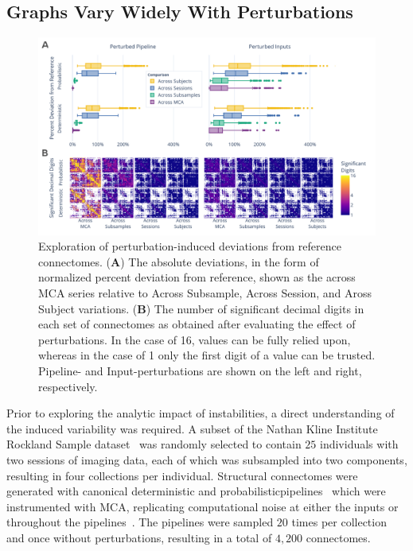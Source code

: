 \documentclass[fleqn,10pt]{SelfArx} %
\begin{document}
\subsection*{Graphs Vary Widely With Perturbations}
\begin{figure}[hbt]\centering
\includegraphics[width=0.98\linewidth]{figures/fig1_absolute_differences.pdf}
\caption{Exploration of perturbation-induced deviations from reference connectomes.
(\textbf{A}) The absolute deviations, in the form of normalized percent deviation from reference, shown as the
across MCA series relative to Across Subsample, Across Session, and Aross Subject variations.
(\textbf{B}) The number of significant decimal digits in each set of connectomes as obtained after evaluating the
effect of perturbations. In the case of 16, values can be fully relied upon, whereas in the case of 1 only the first
digit of a value can be trusted. Pipeline- and Input-perturbations are shown on the left and right, respectively.}
\label{fig:absolute}
\end{figure}

Prior to exploring the analytic impact of instabilities, a direct understanding of the induced variability was
required. A subset of the Nathan Kline Institute Rockland Sample dataset~\cite{Nooner2012-eg} was randomly selected to
contain $25$ individuals with two sessions of imaging data, each of which was subsampled into two components, resulting
in four collections per individual. Structural connectomes were generated with canonical deterministic and
probabilisticpipelines~\cite{Garyfallidis2014-ql,Garyfallidis2012-gg} which were instrumented with MCA, replicating
computational noise at either the inputs or throughout the pipelines~\cite{Denis2016-wo,Kiar2020-lb}. The pipelines
were sampled $20$ times per collection and once without perturbations, resulting in a total of $4,200$ connectomes.
\end{document}
